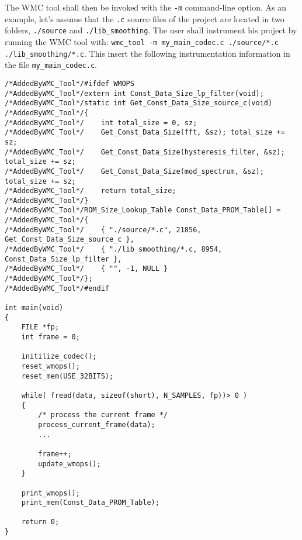 The WMC tool shall then be invoked with the \verb|-m| command-line option. As an example, let's assume that the \verb|.c| source files of the project are located in two folders, \verb|./source| and \verb|./lib_smoothing|. The user shall instrument his project by running the WMC tool with: \verb|wmc_tool -m my_main_codec.c ./source/*.c ./lib_smoothing/*.c|. This insert the following instrumentation information in the file \verb|my_main_codec.c|.

\begin{Verbatim}[fontsize=\small]
/*AddedByWMC_Tool*/#ifdef WMOPS
/*AddedByWMC_Tool*/extern int Const_Data_Size_lp_filter(void);
/*AddedByWMC_Tool*/static int Get_Const_Data_Size_source_c(void)
/*AddedByWMC_Tool*/{
/*AddedByWMC_Tool*/    int total_size = 0, sz;
/*AddedByWMC_Tool*/    Get_Const_Data_Size(fft, &sz); total_size += sz;
/*AddedByWMC_Tool*/    Get_Const_Data_Size(hysteresis_filter, &sz); total_size += sz;
/*AddedByWMC_Tool*/    Get_Const_Data_Size(mod_spectrum, &sz); total_size += sz;
/*AddedByWMC_Tool*/    return total_size;
/*AddedByWMC_Tool*/}
/*AddedByWMC_Tool*/ROM_Size_Lookup_Table Const_Data_PROM_Table[] =
/*AddedByWMC_Tool*/{
/*AddedByWMC_Tool*/    { "./source/*.c", 21856, Get_Const_Data_Size_source_c },
/*AddedByWMC_Tool*/    { "./lib_smoothing/*.c, 8954, Const_Data_Size_lp_filter },
/*AddedByWMC_Tool*/    { "", -1, NULL }
/*AddedByWMC_Tool*/};
/*AddedByWMC_Tool*/#endif

int main(void)
{
    FILE *fp;
    int frame = 0;

    initilize_codec();
    reset_wmops();
    reset_mem(USE_32BITS);

    while( fread(data, sizeof(short), N_SAMPLES, fp))> 0 )
    {
        /* process the current frame */
        process_current_frame(data);
        ...

        frame++;
        update_wmops();
    }

    print_wmops();
    print_mem(Const_Data_PROM_Table);

    return 0;
}
\end{Verbatim}

